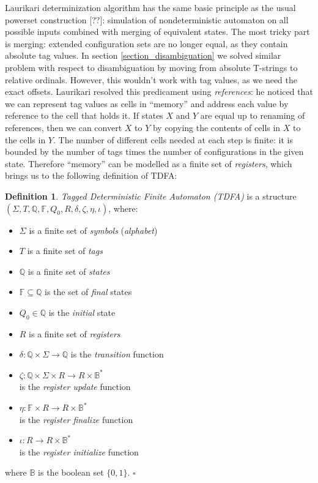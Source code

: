 \documentclass{article}
\newcommand{\YB}{\mathbb{B}}
\newcommand{\YF}{\mathbb{F}}
\newcommand{\YQ}{\mathbb{Q}}
\theoremstyle{definition}
\newtheorem{Xdef}{Definition}
\begin{document}
\begin{multicols}{2}
Laurikari determinization algorithm has the same basic principle as the usual powerset construction [??]:
simulation of nondeterministic automaton on all possible inputs combined with merging of equivalent states.
The most tricky part is merging: extended configuration sets are no longer equal, as they contain absolute tag values.
In section \ref{section_disambiguation} we solved similar problem with respect to disambiguation
by moving from absolute T-strings to relative ordinals.
However, this wouldn't work with tag values, as we need the exact offsets.
Laurikari resolved this predicament using \emph{references}:
he noticed that we can represent tag values as cells in ``memory'' and address each value by reference to the cell that holds it.
If states $X$ and $Y$ are equal up to renaming of references,
then we can convert $X$ to $Y$ by copying the contents of cells in $X$ to the cells in $Y$.
The number of different cells needed at each step is finite:
it is bounded by the number of tags times the number of configurations in the given state.
Therefore ``memory'' can be modelled as a finite set of \emph{registers},
which brings us to the following definition of TDFA:

    \begin{Xdef}
    \emph{Tagged Deterministic Finite Automaton (TDFA)}
    is a structure $(\Sigma, T, \YQ, \YF, Q_0, R, \delta, \zeta, \eta, \iota)$, where:
    \begin{itemize}
    \setlength{\parskip}{0.5em}
        \item[] $\Sigma$ is a finite set of \emph{symbols} (\emph{alphabet})
        \item[] $T$ is a finite set of \emph{tags}
        \item[] $\YQ$ is a finite set of \emph{states}
        \item[] $\YF \subseteq \YQ$ is the set of \emph{final} states
        \item[] $Q_0 \in \YQ$ is the \emph{initial} state
        \item[] $R$ is a finite set of \emph{registers}
        \item[] $\delta: \YQ \times \Sigma \to \YQ$ is the \emph{transition} function
        \item[] $\zeta: \YQ \times \Sigma \times R \to R \times \YB^*$ \\
            is the \emph{register update} function
        \item[] $\eta: \YF \times R \to R \times \YB^*$ \\
            is the \emph{register finalize} function
        \item[] $\iota: R \to R \times \YB^*$ \\
            is the \emph{register initialize} function
    \end{itemize}
    where $\YB$ is the boolean set $\{0,1\}$.
    $\square$
    \end{Xdef}


\end{multicols}
\end{document}
